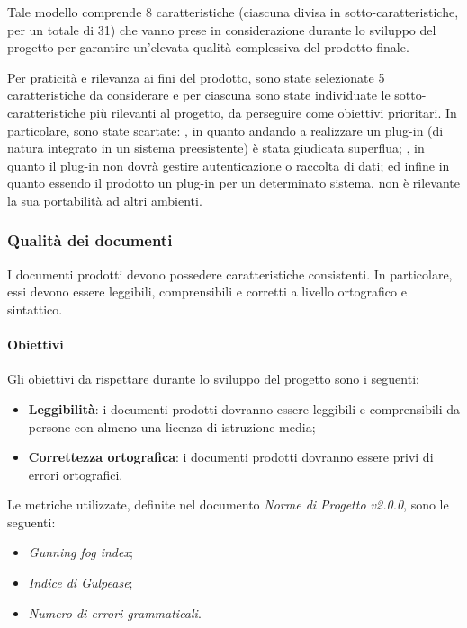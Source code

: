 Tale modello comprende 8 caratteristiche (ciascuna divisa in sotto-caratteristiche, per un totale di 31) che vanno prese in considerazione durante lo sviluppo del progetto per garantire un'elevata qualità complessiva del prodotto finale.

Per praticità e rilevanza ai fini del prodotto, sono state selezionate 5 caratteristiche da considerare e per ciascuna sono state individuate le sotto-caratteristiche più rilevanti al progetto, da perseguire come obiettivi prioritari. In particolare, sono state scartate: , in quanto andando a realizzare un plug-in (di natura integrato in un sistema preesistente) è stata giudicata superflua; , in quanto il plug-in non dovrà gestire autenticazione o raccolta di dati; ed infine  in quanto essendo il prodotto un plug-in per un determinato sistema, non è rilevante la sua portabilità ad altri ambienti. 

\subsubsection{Qualità dei documenti}
I documenti prodotti devono possedere caratteristiche consistenti. In particolare, essi devono essere leggibili, comprensibili e corretti a livello ortografico e sintattico.
\paragraph{Obiettivi} \Spazio
Gli obiettivi da rispettare durante lo sviluppo del progetto sono i seguenti:
	\begin{itemize}
		\item{\textbf{Leggibilità}: i documenti prodotti dovranno essere leggibili e comprensibili da persone con almeno una licenza di istruzione media;}
		\item{\textbf{Correttezza ortografica}: i documenti prodotti dovranno essere privi di errori ortografici.}
	\end{itemize}

Le metriche utilizzate, definite nel documento \emph{Norme di Progetto v2.0.0}, sono le seguenti:

\begin{itemize}
		\item{\emph{Gunning fog index};}
		\item{\emph{Indice di Gulpease};}	
		\item{\emph{Numero di errori grammaticali}.}
\end{itemize}

